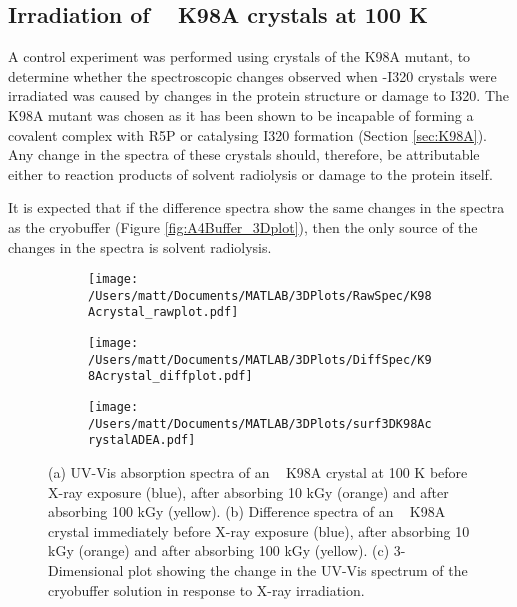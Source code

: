\subsection{Irradiation of \atpdx~ K98A crystals at 100 K}
A control experiment was performed using crystals of the K98A mutant, to determine whether the spectroscopic changes observed when \atpdx -I320 crystals were irradiated was caused by changes in the protein structure or damage to I320. The K98A mutant was chosen as it has been shown to be incapable of forming a covalent complex with R5P or catalysing I320 formation (Section \ref{sec:K98A}). Any change in the spectra of these crystals should, therefore, be attributable either to reaction products of solvent radiolysis or damage to the protein itself.  

It is expected that if the difference spectra show the same changes in the spectra as the cryobuffer (Figure \ref{fig:A4Buffer_3Dplot}), then the only source of the changes in the spectra is solvent radiolysis. 
    
\begin{figure}[!htbp]
\centering
\begin{subfigure}{.33\textwidth}
  \centering
  \texttt{[image: /Users/matt/Documents/MATLAB/3DPlots/RawSpec/K98Acrystal\_rawplot.pdf]}
  \caption{}
  \label{fig:K98ACrystal_raw}
\end{subfigure}%
\begin{subfigure}{.33\textwidth}
  \centering
  \texttt{[image: /Users/matt/Documents/MATLAB/3DPlots/DiffSpec/K98Acrystal\_diffplot.pdf]}
  \caption{}
  \label{fig:K98ACrystal_diff}
\end{subfigure}
\begin{subfigure}{.33\textwidth}
  \centering
  \texttt{[image: /Users/matt/Documents/MATLAB/3DPlots/surf3DK98AcrystalADEA.pdf]}
  \caption{}
  \label{fig:K98ACrystal_3Dplot}
\end{subfigure}
\caption[UV-Vis Spectra of an X-ray irradiated \atpdx~ K98A crystal]{(a) UV-Vis absorption spectra of an \atpdx~ K98A crystal at 100 K before X-ray exposure (blue), after absorbing 10 \si{\kilo\gray} (orange) and after absorbing 100 \si{\kilo\gray} (yellow). (b) Difference spectra of an \atpdx~ K98A crystal immediately before X-ray exposure (blue), after absorbing 10 \si{\kilo\gray} (orange) and after absorbing 100 \si{\kilo\gray} (yellow). (c) 3-Dimensional plot showing the change in the UV-Vis spectrum of the cryobuffer solution in response to X-ray irradiation.}
\end{figure}


